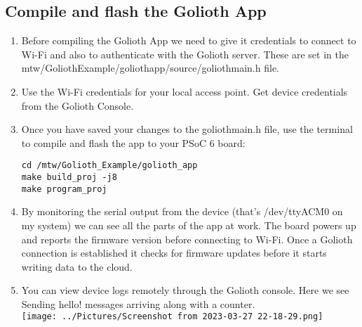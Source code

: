 \documentclass[journal,5pt,twocolumn]{IEEEtran}
\begin{document}
  \subsection{\textbf{Compile and flash the Golioth App}}
 \begin{enumerate}
\item Before compiling the Golioth App we need to give it credentials to connect to Wi-Fi and also to authenticate with the Golioth server. These are set in the mtw/GoliothExample/goliothapp/source/goliothmain.h file.
\item Use the Wi-Fi credentials for your local access point. Get device credentials from the Golioth Console. 
\item Once you have saved your changes to the goliothmain.h file, use the terminal to compile and flash the app to your PSoC 6 board:
 \begin{lstlisting}
cd /mtw/Golioth_Example/golioth_app
make build_proj -j8
make program_proj
 \end{lstlisting}
\item  By monitoring the serial output from the device (that's /dev/ttyACM0 on my system) we can see all the parts of the app at work. The board powers up and reports the firmware version before connecting to Wi-Fi. Once a Golioth connection is established it checks for firmware updates before it starts writing data to the cloud.
\item  You can view device logs remotely through the Golioth console. Here we see Sending hello! messages arriving along with a counter.\\
\vspace{10mm}
\texttt{[image: ../Pictures/Screenshot from 2023-03-27 22-18-29.png]} 
 \end{enumerate}
 
\end{document}
